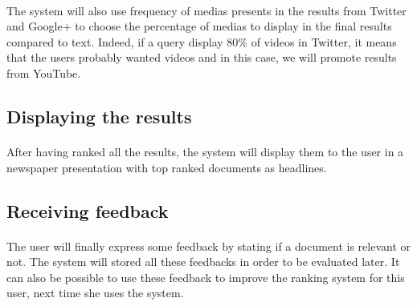 \documentclass[english,7pt]{article}
\begin{document}
\paragraph{}The system will also use frequency of medias presents in the results from Twitter and Google+ to choose the percentage of medias to display in the final results compared to text. Indeed, if a query display 80\% of videos in Twitter, it means that the users probably wanted videos and in this case, we will promote results from YouTube.

\subsection{Displaying the results}
\paragraph{}After having ranked all the results, the system will display them to the user in a newspaper presentation with top ranked documents as headlines.

\subsection{Receiving feedback}
\paragraph{}The user will finally express some feedback by stating if a document is relevant or not. The system will stored all these feedbacks in order to be evaluated later. It can also be possible to use these feedback to improve the ranking system for this user, next time she uses the system.

 
\end{document}

